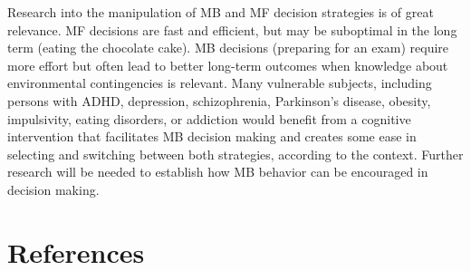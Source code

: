\documentclass[11pt]{article} %
\begin{document}
Research into the manipulation of MB and MF decision strategies is of great relevance. MF decisions are fast and efficient, but may be suboptimal in the long term (eating the chocolate cake). MB decisions (preparing for an exam) require more effort but often lead to better long-term outcomes when knowledge about environmental contingencies is relevant. Many vulnerable subjects, including persons with ADHD, depression, schizophrenia, Parkinson's disease, obesity, impulsivity, eating disorders, or addiction would benefit from a cognitive intervention that facilitates MB decision making and creates some ease in selecting and switching between both strategies, according to the context. Further research will be needed to establish how MB behavior can be encouraged in decision making.

\section{References}

\printbibliography
\end{document}
